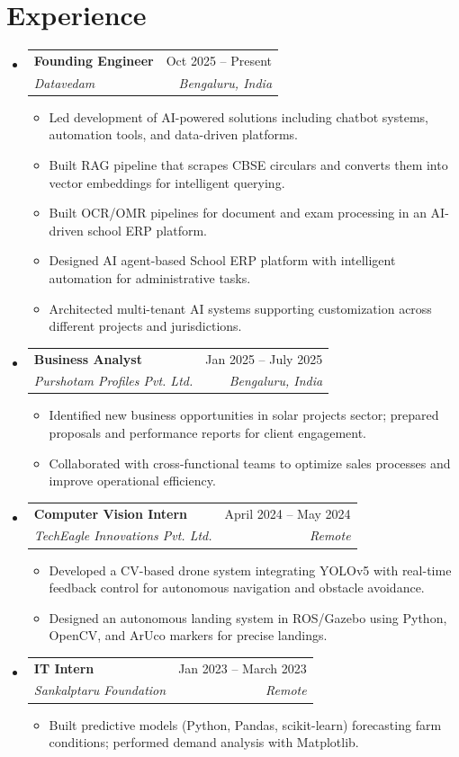 \documentclass[letterpaper,10pt]{article}
\makeatletter
\newcommand{\resumeItem}[1]{
  \item\small{
    {#1 \vspace{-1pt}}
  }
}
\newcommand{\resumeSubheading}[4]{
  \vspace{-1pt}\item
    \begin{tabular*}{0.97\textwidth}[t]{l@{\extracolsep{\fill}}r}
      \textbf{#1} & #2 \\
      \textit{\small #3} & \textit{\small #4} \\
    \end{tabular*}\vspace{-5pt}
}
\newcommand{\resumeSubHeadingListStart}{\begin{itemize}[leftmargin=0.15in, label={}]}
\newcommand{\resumeSubHeadingListEnd}{\end{itemize}\vspace{-5pt}}
\newcommand{\resumeItemListStart}{\begin{itemize}\vspace{-3pt}}
\newcommand{\resumeItemListEnd}{\end{itemize}\vspace{-2pt}}
\makeatother
\begin{document}
\section{Experience}
\resumeSubHeadingListStart
    \resumeSubheading
      {Founding Engineer}{Oct 2025 -- Present}
      {Datavedam}{Bengaluru, India}
      \resumeItemListStart
        \resumeItem{Led development of AI-powered solutions including chatbot systems, automation tools, and data-driven platforms.}
        \resumeItem{Built RAG pipeline that scrapes CBSE circulars and converts them into vector embeddings for intelligent querying.}
        \resumeItem{Built OCR/OMR pipelines for document and exam processing in an AI-driven school ERP platform.}
        \resumeItem{Designed AI agent-based School ERP platform with intelligent automation for administrative tasks.}
        \resumeItem{Architected multi-tenant AI systems supporting customization across different projects and jurisdictions.}
      \resumeItemListEnd
    \resumeSubheading
      {Business Analyst}{Jan 2025 -- July 2025}
      {Purshotam Profiles Pvt. Ltd.}{Bengaluru, India}
      \resumeItemListStart
        \resumeItem{Identified new business opportunities in solar projects sector; prepared proposals and performance reports for client engagement.}
        \resumeItem{Collaborated with cross-functional teams to optimize sales processes and improve operational efficiency.}
      \resumeItemListEnd
    \resumeSubheading
      {Computer Vision Intern}{April 2024 -- May 2024}
      {TechEagle Innovations Pvt. Ltd.}{Remote}
      \resumeItemListStart
        \resumeItem{Developed a CV-based drone system integrating YOLOv5 with real-time feedback control for autonomous navigation and obstacle avoidance.}
        \resumeItem{Designed an autonomous landing system in ROS/Gazebo using Python, OpenCV, and ArUco markers for precise landings.}
      \resumeItemListEnd
    \resumeSubheading
      {IT Intern}{Jan 2023 -- March 2023}
      {Sankalptaru Foundation}{Remote}
      \resumeItemListStart
        \resumeItem{Built predictive models (Python, Pandas, scikit-learn) forecasting farm conditions; performed demand analysis with Matplotlib.}
      \resumeItemListEnd
\resumeSubHeadingListEnd
\end{document}
